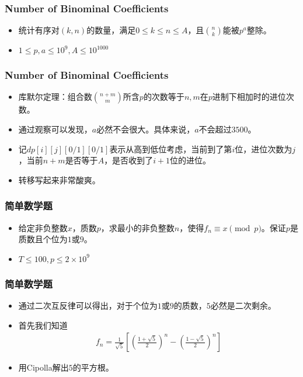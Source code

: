 \documentclass{beamer}
\begin{document}
\begin{frame}
    \frametitle{Number of Binominal Coefficients}
    \begin{itemize}
        \item 统计有序对$(k, n)$的数量，满足$0\leq k\leq n\leq A$，且${n\choose k}$能被$p^a$整除。
        \item $1\leq p, a\leq 10^9, A\leq 10^{1000}$
    \end{itemize}
\end{frame}

\begin{frame}
    \frametitle{Number of Binominal Coefficients}
    \begin{itemize}
        \item 库默尔定理：组合数${n + m\choose m}$所含$p$的次数等于$n, m$在$p$进制下相加时的进位次数。
        \item 通过观察可以发现，$a$必然不会很大。具体来说，$a$不会超过$3500$。
        \item 记$dp[i][j][0/1][0/1]$表示从高到低位考虑，当前到了第$i$位，进位次数为$j$，当前$n + m$是否等于$A$，是否收到了$i + 1$位的进位。
        \item 转移写起来非常酸爽。
    \end{itemize}
\end{frame}

\begin{frame}
    \frametitle{简单数学题}
    \begin{itemize}
        \item 给定非负整数$x$，质数$p$，求最小的非负整数$n$，使得$f_n\equiv x\pmod p$。保证$p$是质数且个位为$1$或$9$。
        \item $T\leq 100, p\leq 2\times 10^9$
    \end{itemize}
\end{frame}

\begin{frame}
    \frametitle{简单数学题}
    \begin{itemize}
        \item 通过二次互反律可以得出，对于个位为$1$或$9$的质数，$5$必然是二次剩余。
        \item 首先我们知道
        $$\begin{aligned}
            f_n = \frac{1}{\sqrt 5}\left[\left(\frac{1 + \sqrt 5}{2}\right)^n - \left(\frac{1 - \sqrt 5}{2}\right)^n\right]
        \end{aligned}$$
        \item 用Cipolla解出$5$的平方根。
    \end{itemize}
\end{frame}
\end{document}
